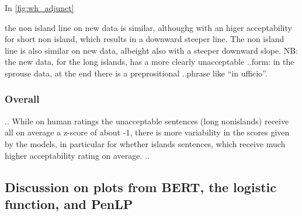 In \autoref{fig:wh_adjunct}

the non island line on new data is similar, althoughg with an higer acceptability for short non island, which results in a downward steeper line. The non island line is also similar on new data, albeight also with a steeper downward slope.
NB: the new data, for the long islands, has a more clearly unacceptable ..form: in the sprouse data, at the end there is a preprositional ..phrase like “in ufficio”.

\subsubsection{Overall}
..
While on human ratings the unacceptable sentences (long nonislands) receive all on average a z-score of about -1, there is more variability in the scores given by the models, in particular for whether islands sentences, which receive much higher acceptability rating on average.
..






\subsection{Discussion on plots from BERT, the logistic function, and PenLP}



